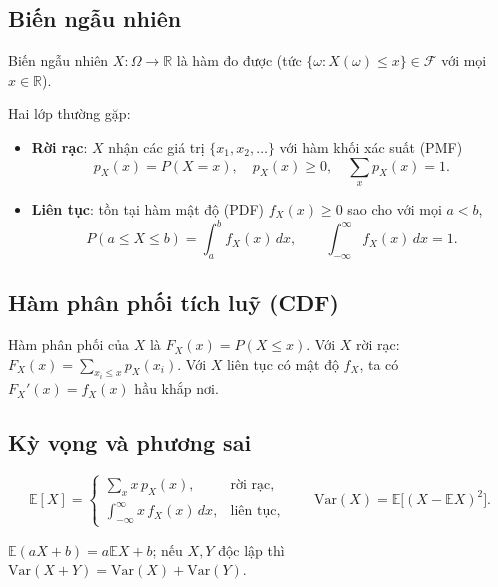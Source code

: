 \subsection{Biến ngẫu nhiên}
\begin{dn}
Biến ngẫu nhiên $X\!:\Omega\to\mathbb{R}$ là hàm đo được (tức $\{\omega: X(\omega)\le x\}\in\mathcal{F}$ với mọi $x\in\mathbb{R}$).
\end{dn}
Hai lớp thường gặp:
\begin{itemize}
    \item \textbf{Rời rạc}: $X$ nhận các giá trị $\{x_1,x_2,\ldots\}$ với hàm khối xác suất (PMF)
    \[
    p_X(x)=P(X=x),\quad p_X(x)\ge0,\quad \sum_x p_X(x)=1.
    \]
    \item \textbf{Liên tục}: tồn tại hàm mật độ (PDF) $f_X(x)\ge0$ sao cho với mọi $a<b$,
    \[
    P(a\le X\le b)=\int_a^b f_X(x)\,dx,\qquad \int_{-\infty}^{\infty} f_X(x)\,dx=1.
    \]
\end{itemize}

\subsection{Hàm phân phối tích luỹ (CDF)}
\begin{dn}
Hàm phân phối của $X$ là $F_X(x)=P(X\le x)$. Với $X$ rời rạc: $F_X(x)=\sum_{x_i\le x}p_X(x_i)$. Với $X$ liên tục có mật độ $f_X$, ta có $F_X'(x)=f_X(x)$ hầu khắp nơi.
\end{dn}

\subsection{Kỳ vọng và phương sai}
\[
\mathbb{E}[X]=\begin{cases} \sum_x x\,p_X(x), & \text{rời rạc},\\[4pt]
\int_{-\infty}^{\infty} x\,f_X(x)\,dx, & \text{liên tục}, \end{cases}
\qquad \text{Var}(X)=\mathbb{E}\big[(X-\mathbb{E}X)^2\big].
\]
\begin{tinhchat}
$\mathbb{E}(aX+b)=a\mathbb{E}X+b$; nếu $X,Y$ độc lập thì $\text{Var}(X+Y)=\text{Var}(X)+\text{Var}(Y)$.
\end{tinhchat}

